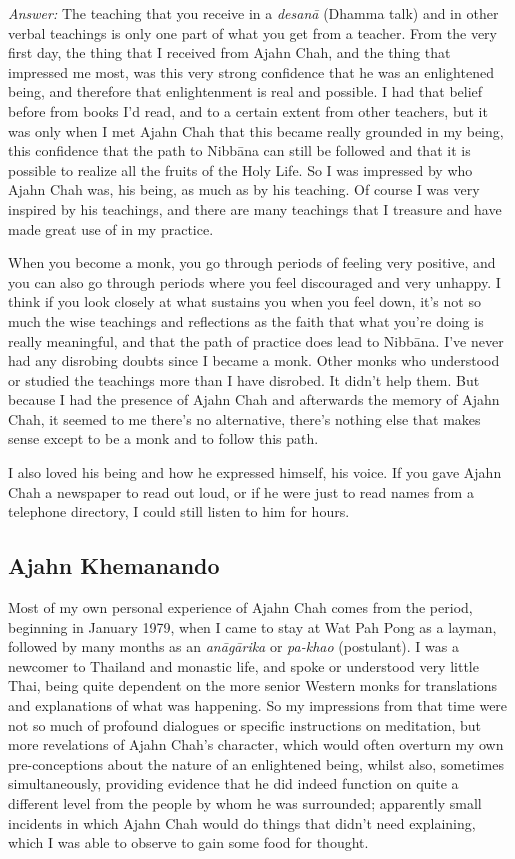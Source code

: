 \emph{Answer:} The teaching that you receive in a \emph{desanā} (Dhamma
talk) and in other verbal teachings is only one part of what you get
from a teacher. From the very first day, the thing that I received from
Ajahn Chah, and the thing that impressed me most, was this very strong
confidence that he was an enlightened being, and therefore that
enlightenment is real and possible. I had that belief before from books
I'd read, and to a certain extent from other teachers, but it was only
when I met Ajahn Chah that this became really grounded in my being, this
confidence that the path to Nibbāna can still be followed and that it is
possible to realize all the fruits of the Holy Life. So I was impressed
by who Ajahn Chah was, his being, as much as by his teaching. Of course
I was very inspired by his teachings, and there are many teachings that
I treasure and have made great use of in my practice.

When you become a monk, you go through periods of feeling very positive,
and you can also go through periods where you feel discouraged and very
unhappy. I think if you look closely at what sustains you when you feel
down, it's not so much the wise teachings and reflections as the faith
that what you're doing is really meaningful, and that the path of
practice does lead to Nibbāna. I've never had any disrobing doubts since
I became a monk. Other monks who understood or studied the teachings
more than I have disrobed. It didn't help them. But because I had the
presence of Ajahn Chah and afterwards the memory of Ajahn Chah, it
seemed to me there's no alternative, there's nothing else that makes
sense except to be a monk and to follow this path.

I also loved his being and how he expressed himself, his voice. If you
gave Ajahn Chah a newspaper to read out loud, or if he were just to read
names from a telephone directory, I could still listen to him for hours.

\subsection{Ajahn Khemanando}

Most of my own personal experience of Ajahn Chah comes from the period, 
beginning in January 1979, when I came to stay at Wat Pah Pong as a
layman, followed by many months as an \emph{anāgārika} or \emph{pa-khao}
 (postulant). I was a newcomer to Thailand and monastic life, and spoke
or understood very little Thai, being quite dependent on the more senior
Western monks for translations and explanations of what was happening. 
So my impressions from that time were not so much of profound dialogues
or specific instructions on meditation, but more revelations of Ajahn
Chah's character, which would often overturn my own pre-conceptions
about the nature of an enlightened being, whilst also, sometimes
simultaneously, providing evidence that he did indeed function on quite
a different level from the people by whom he was surrounded; apparently
small incidents in which Ajahn Chah would do things that didn't need
explaining, which I was able to observe to gain some food for thought. 

